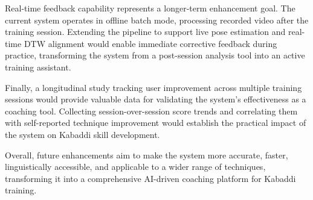 \begin{sloppypar}
Real-time feedback capability represents a longer-term enhancement goal. The current system operates in offline batch mode, processing recorded video after the training session. Extending the pipeline to support live pose estimation and real-time DTW alignment would enable immediate corrective feedback during practice, transforming the system from a post-session analysis tool into an active training assistant.

Finally, a longitudinal study tracking user improvement across multiple training sessions would provide valuable data for validating the system's effectiveness as a coaching tool. Collecting session-over-session score trends and correlating them with self-reported technique improvement would establish the practical impact of the system on Kabaddi skill development.

Overall, future enhancements aim to make the system more accurate, faster, linguistically accessible, and applicable to a wider range of techniques, transforming it into a comprehensive AI-driven coaching platform for Kabaddi training.

\end{sloppypar}
